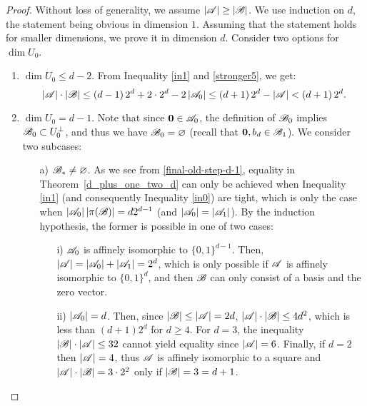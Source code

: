 \begin{proof}
     Without loss of generality, we assume $\left|{\mathscr{A}}\right| \geq \left|{\mathscr{B}}\right|$. We  use induction on $d$, the statement being obvious in dimension $1$. Assuming that the statement holds for smaller dimensions, we prove it in dimension $d$. Consider two options for $\operatorname{dim}U_0$.
    \begin{enumerate}
        \item $\operatorname{dim}U_0 \leq d-2$. From Inequality \ref{in1} and \eqref{stronger5}, we get:
        \begin{equation*}
            \left|{\mathscr{A}}\right| \cdot\left|{\mathscr{B}}\right| \leq 
            \left(d - 1\right) 2^d + 2\cdot2^d - 2\left|{\mathscr{A}}_0\right| \leq
            \left(d + 1\right) 2^d - \left|{\mathscr{A}}\right| < \left(d + 1\right) 2^d.
        \end{equation*}
        \item $\operatorname{dim}U_0 = d-1$. Note that since $\mathbf{0} \in {\mathscr{A}}_0$, the definition of ${\mathscr{B}}_0$ implies ${\mathscr{B}}_0 \subset U_0^\bot$, and thus  we have ${\mathscr{B}}_0 = \varnothing$ (recall that $\mathbf{0}, b_d \in {\mathscr{B}}_1$). We consider two subcases:
        \begin{enumerate}
            \item[a)]\label{uniqfirstcase} ${\mathscr{B}}_*\neq\varnothing$. As we see from \eqref{final-old-step-d-1}, equality in Theorem~\ref{d_plus_one_two_d} can only be achieved when %
            Inequality \ref{in1} (and consequently Inequality \ref{in0}) are tight, which is only the case when  $\left|{\mathscr{A}}_0\right|\left|\pi({\mathscr{B}})\right|=d 2^{d-1}$ (and $\left|{\mathscr{A}}_0\right|=\left|{\mathscr{A}}_1\right|$). By the induction hypothesis, the former is possible in one of two cases:
            \begin{enumerate}
                \item[i)] ${\mathscr{A}}_0$ is affinely isomorphic to $\{0,1\}^{d-1}$. Then, $\left|{\mathscr{A}}\right|=\left|{\mathscr{A}}_0\right|+\left|{\mathscr{A}}_1\right|=2^d$, which is only possible if ${\mathscr{A}}$ is affinely isomorphic to $\{0,1\}^d$, and then ${\mathscr{B}}$ can only consist of a basis and the zero vector.
                \item[ii)] $\left|{\mathscr{A}}_0\right|=d$. Then, since $\left|{\mathscr{B}}\right|\leq\left|{\mathscr{A}}\right|=2d$,  $\left|{\mathscr{A}}\right|\cdot\left|{\mathscr{B}}\right|\leq4d^2$, which is less than $(d+1)2^d$ for $d\geq4$. For $d=3$, the inequality $\left|{\mathscr{B}}\right|\cdot\left|{\mathscr{A}}\right|\leq32$ cannot yield equality since $\left|{\mathscr{A}}\right|=6$. Finally, if $d=2$ then $|{\mathscr{A}}|=4$, thus ${\mathscr{A}}$ is affinely isomorphic to a square  and $|{\mathscr{A}}|\cdot|{\mathscr{B}}| = 3 \cdot 2^2$ only if $|{\mathscr{B}}|=3=d+1$.

\end{enumerate}
\end{enumerate}
\end{enumerate}
\end{proof}
